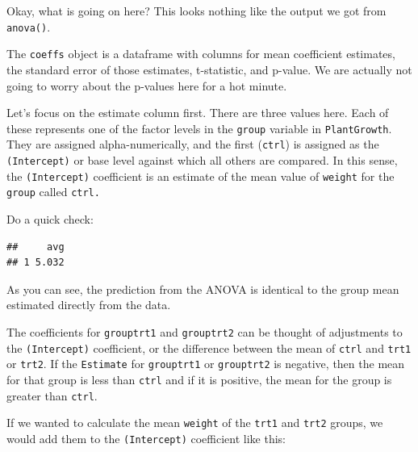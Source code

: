 \documentclass[
]{book}
\newenvironment{Shaded}{\begin{snugshade}}{\end{snugshade}}
\newcommand{\CommentTok}[1]{\textcolor[rgb]{0.56,0.35,0.01}{\textit{#1}}}
\newcommand{\DataTypeTok}[1]{\textcolor[rgb]{0.13,0.29,0.53}{#1}}
\newcommand{\KeywordTok}[1]{\textcolor[rgb]{0.13,0.29,0.53}{\textbf{#1}}}
\newcommand{\NormalTok}[1]{#1}
\newcommand{\OperatorTok}[1]{\textcolor[rgb]{0.81,0.36,0.00}{\textbf{#1}}}
\newcommand{\StringTok}[1]{\textcolor[rgb]{0.31,0.60,0.02}{#1}}
\begin{document}
Okay, what is going on here? This looks nothing like the output we got from \texttt{anova()}.

The \texttt{coeffs} object is a dataframe with columns for mean coefficient estimates, the standard error of those estimates, t-statistic, and p-value. We are actually not going to worry about the p-values here for a hot minute.

Let's focus on the estimate column first. There are three values here. Each of these represents one of the factor levels in the \texttt{group} variable in \texttt{PlantGrowth}. They are assigned alpha-numerically, and the first (\texttt{ctrl}) is assigned as the \texttt{(Intercept)} or base level against which all others are compared. In this sense, the \texttt{(Intercept)} coefficient is an estimate of the mean value of \texttt{weight} for the \texttt{group} called \texttt{ctrl.}

Do a quick check:

\begin{Shaded}
\end{Shaded}

\begin{verbatim}
##     avg
## 1 5.032
\end{verbatim}

As you can see, the prediction from the ANOVA is identical to the group mean estimated directly from the data.

The coefficients for \texttt{grouptrt1} and \texttt{grouptrt2} can be thought of adjustments to the \texttt{(Intercept)} coefficient, or the difference between the mean of \texttt{ctrl} and \texttt{trt1} or \texttt{trt2}. If the \texttt{Estimate} for \texttt{grouptrt1} or \texttt{grouptrt2} is negative, then the mean for that group is less than \texttt{ctrl} and if it is positive, the mean for the group is greater than \texttt{ctrl}.

If we wanted to calculate the mean \texttt{weight} of the \texttt{trt1} and \texttt{trt2} groups, we would add them to the \texttt{(Intercept)} coefficient like this:
\end{document}

